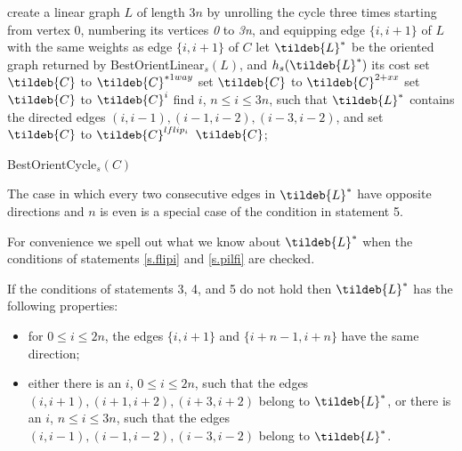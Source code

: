 \begin{algorithm}
	create a linear graph $L$ of 
	length $3n$ by unrolling the cycle three times starting from vertex $0$,
	numbering its vertices \textit{0} to \textit{3n}, and
	equipping edge $\{i,i+1\}$ of $L$ with the same weights as edge 
	$\{i ,i+1\}$ of $C$\;
	let $\tildeb{L}^*$ be the oriented graph returned by BestOrientLinear$_s(L)$, and $h_s(\tildeb{L}^*)$ its cost\;
	{set $\tildeb{C}$ to $\tildeb{C}^{*1way}$}
	{
	{set $\tildeb{C}$ to $\tildeb{C}^{2+xx}$}
	}
	{set $\tildeb{C}$ to $\tildeb{C}^{i}$
	}\label{s.flipi}
	\label{s.pilfi}
	\lElse
	{find $i$, $n\leq i \leq 3n$,  such that
		$\tildeb{L}^*$ contains the directed edges 
		$(i,i-1),(i-1,i-2),(i-3,i-2)$, and
		set $\tildeb{C}$ to $\tildeb{C}^{lflip_i}$}
	\Return $\tildeb{C}$;
	\caption{BestOrientCycle$_s(C)$}
	\label{algo:oc-s}
\end{algorithm}
\begin{remark}
The case in which every two consecutive edges in  $\tildeb{L}^*$ have opposite directions and $n$ is even is a special case of the condition in statement 5.
\end{remark}
For convenience we spell out what we know about $\tildeb{L}^*$ when the conditions of statements
\ref{s.flipi} and \ref{s.pilfi} are checked.
\begin{lemma}\label{l.flipc}
	If the conditions of statements 3, 4, and 5 do not hold  then $\tildeb{L}^*$ has the following properties:
	\begin{itemize}
		\item for $0\leq i \leq 2n$, the edges $\{i,i+1\}$ and $\{i+n-1,i+n\}$ have the same direction;
		\item either there is an $i$, $0\leq i\leq 2n$, such that 
		the edges $(i,i+1),(i+1,i+2),(i+3,i+2)$ belong to $\tildeb{L}^*$, or
		there is an $i$, $n\leq i\leq 3n$, such that the edges 
		$(i,i-1),(i-1,i-2),(i-3,i-2)$ belong to $\tildeb{L}^*$. 
	\end{itemize}
\end{lemma}
